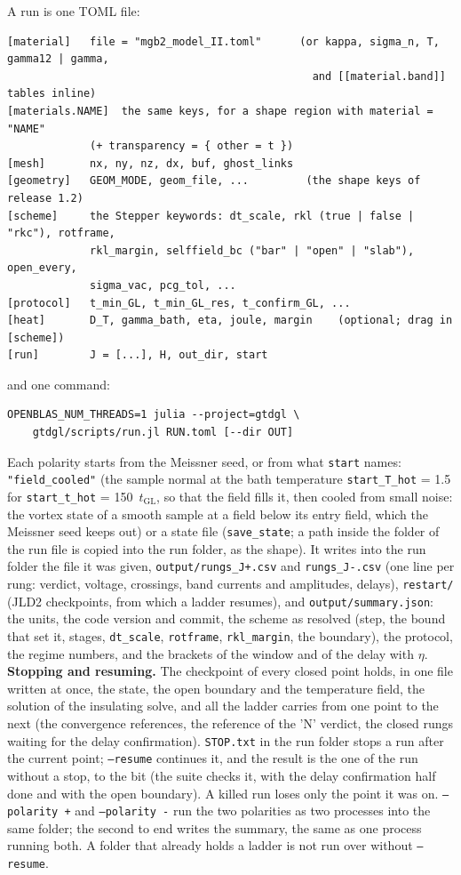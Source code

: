\documentclass[11pt,a4paper]{article}
\newcommand{\tGL}{t_{\mathrm{GL}}}
\newcommand{\code}[1]{\texttt{#1}}
\begin{document}
A run is one TOML file:
\begin{verbatim}
[material]   file = "mgb2_model_II.toml"      (or kappa, sigma_n, T, gamma12 | gamma,
                                                and [[material.band]] tables inline)
[materials.NAME]  the same keys, for a shape region with material = "NAME"
             (+ transparency = { other = t })
[mesh]       nx, ny, nz, dx, buf, ghost_links
[geometry]   GEOM_MODE, geom_file, ...         (the shape keys of release 1.2)
[scheme]     the Stepper keywords: dt_scale, rkl (true | false | "rkc"), rotframe,
             rkl_margin, selffield_bc ("bar" | "open" | "slab"), open_every,
             sigma_vac, pcg_tol, ...
[protocol]   t_min_GL, t_min_GL_res, t_confirm_GL, ...
[heat]       D_T, gamma_bath, eta, joule, margin    (optional; drag in [scheme])
[run]        J = [...], H, out_dir, start
\end{verbatim}
and one command:
\begin{verbatim}
OPENBLAS_NUM_THREADS=1 julia --project=gtdgl \
    gtdgl/scripts/run.jl RUN.toml [--dir OUT]
\end{verbatim}
Each polarity starts from the Meissner seed, or from what \code{start} names: \code{"field\_cooled"} (the sample normal at the
bath temperature \code{start\_T\_hot} = 1.5 for \code{start\_t\_hot} = 150~$\tGL$, so that the field fills it, then cooled from
small noise: the vortex state of a smooth sample at a field below its entry field, which the Meissner seed keeps out) or a state
file (\code{save\_state}; a path inside the folder of the run file is copied into the run folder, as the shape). It writes into the run folder the file it was given, \code{output/rungs\_J+.csv} and \code{rungs\_J-.csv} (one line per
rung: verdict, voltage, crossings, band currents and amplitudes, delays), \code{restart/} (JLD2 checkpoints, from which
a ladder resumes), and \code{output/summary.json}: the units, the code version and commit, the scheme as resolved (step,
the bound that set it, stages, \code{dt\_scale}, \code{rotframe}, \code{rkl\_margin}, the boundary), the protocol, the
regime numbers, and the brackets of the window and of the delay with $\eta$. \textbf{Stopping and resuming.} The checkpoint of every closed point holds, in one file written at once, the state, the
open boundary and the temperature field, the solution of the insulating solve, and all the ladder carries from one point
to the next (the convergence references, the reference of the 'N' verdict, the closed rungs waiting for the delay
confirmation). \code{STOP.txt} in the run folder stops a run after the current point; \code{--resume} continues it, and
the result is the one of the run without a stop, to the bit (the suite checks it, with the delay confirmation half done
and with the open boundary). A killed run loses only the point it was on. \code{--polarity +} and \code{--polarity -} run
the two polarities as two processes into the same folder; the second to end writes the summary, the same as one process
running both. A folder that already holds a ladder is not run over without \code{--resume}.
\end{document}
